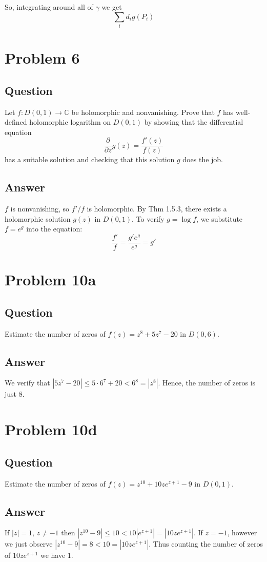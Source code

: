 \documentclass[11pt]{article}
\begin{document}
So, integrating around all of $\gamma$ we get
\[\sum_i d_i g(P_i)\]
\section{Problem 6}
\subsection{Question}
Let $f : D(0,1) \to \mathbb{C}$ be holomorphic and nonvanishing. Prove that $f$ has well-defined holomorphic logarithm on $D(0,1)$ by showing that the differential equation 
\[ \frac{\partial}{\partial z} g(z) = \frac{f'(z)}{f(z)}\]
has a suitable solution and checking that this solution $g$ does the job.
\subsection{Answer}
$f$ is nonvanishing, so $f'/f$ is holomorphic. By Thm 1.5.3, there exists a holomorphic solution $g(z)$ in $D(0,1)$. To verify $g = \log f$, we substitute $f = e^g$ into the equation:
\[\frac{f'}{f} = \frac{g' e^g}{e^g} = g'\]

\section{Problem 10a}
\subsection{Question}
Estimate the number of zeros of $f(z) = z^8 + 5 z^7 -20$ in $D(0,6)$.
\subsection{Answer}
We verify that $|5z^7 - 20 | \leq 5 \cdot 6^7 + 20 < 6^8 = |z^8|$. Hence, the number of zeros is just 8.


\section{Problem 10d}
\subsection{Question}
Estimate the number of zeros of $f(z) = z^{10} + 10 ze ^{z+1} - 9 $ in $D(0,1)$.
\subsection{Answer}
If $|z| =1 $, $z \neq -1$ then $|z^{10} -9| \leq 10 < 10 |e^{z+1}| = |10 ze^{z+1}|$. If $z=-1$, however we just observe $|z^{10} - 9| = 8 < 10 = |10 ze^{z+1}|$. Thus  counting the number of zeros of $10ze^{z+1}$ we have 1.
\end{document}
